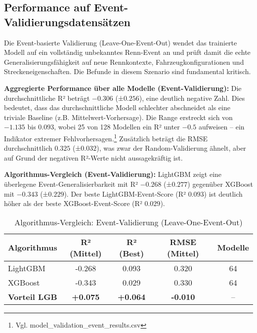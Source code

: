 

\subsection{Performance auf Event-Validierungsdatensätzen}

Die Event-basierte Validierung (Leave-One-Event-Out) wendet das trainierte Modell auf ein vollständig unbekanntes Renn-Event an und prüft damit die echte Generalisierungsfähigkeit auf neue Rennkontexte, Fahrzeugkonfigurationen und Streckeneigenschaften. Die Befunde in diesem Szenario sind fundamental kritisch.

\textbf{Aggregierte Performance über alle Modelle (Event-Validierung):}
Die durchschnittliche R² beträgt $-0.306$ (±$0.256$), eine deutlich negative Zahl. Dies bedeutet, dass das durchschnittliche Modell schlechter abschneidet als eine triviale Baseline (z.B. Mittelwert-Vorhersage). Die Range erstreckt sich von $-1.135$ bis $0.093$, wobei 25 von 128 Modellen ein R² unter $-0.5$ aufweisen – ein Indikator extremer Fehlvorhersagen.\footnote{Vgl. model\_validation\_event\_results.csv} Zusätzlich beträgt die RMSE durchschnittlich $0.325$ (±$0.032$), was zwar der Random-Validierung ähnelt, aber auf Grund der negativen R²-Werte nicht aussagekräftig ist.

\textbf{Algorithmus-Vergleich (Event-Validierung):}
LightGBM zeigt eine überlegene Event-Generalisierbarkeit mit R² $-0.268$ (±$0.277$) gegenüber XGBoost mit $-0.343$ (±$0.229$). Der beste LightGBM-Event-Score (R² $0.093$) ist deutlich höher als der beste XGBoost-Event-Score (R² $0.029$).

\begin{table}[H]
  \centering
  \begin{tabular}{lcccc}
    \toprule
    \textbf{Algorithmus} & \textbf{R² (Mittel)} & \textbf{R² (Best)} & \textbf{RMSE (Mittel)} & \textbf{Modelle} \\
    \midrule
    LightGBM & -0.268 & 0.093 & 0.320 & 64 \\
    XGBoost & -0.343 & 0.029 & 0.330 & 64 \\
    \midrule
    \textbf{Vorteil LGB} & \textbf{+0.075} & \textbf{+0.064} & \textbf{-0.010} & -- \\
    \bottomrule
  \end{tabular}
  \caption{Algorithmus-Vergleich: Event-Validierung (Leave-One-Event-Out)}
  \label{tab:algo_event}
\end{table}

